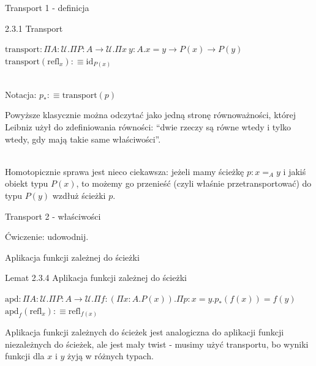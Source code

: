 \documentclass{beamer}
\newcommand{\defn}{:\equiv}
\newcommand{\U}{\mathcal{U}}
\newcommand{\refl}[1]{\text{refl}_{#1}}
\newcommand{\apd}[2]{\text{apd}_{#1}(#2)}
\begin{document}
\begin{frame}{Transport 1 - definicja}

\begin{block}{2.3.1 Transport}

$\text{transport} : \Pi A : \U. \Pi P : A \to \U. \Pi x\ y : A. x = y \to P(x) \to P(y)$ \\
$\text{transport}(\refl{x}) \defn \text{id}_{P(x)}$ \\~\

Notacja: $p_* \defn \text{transport}(p)$

\end{block}

Powyższe klasycznie można odczytać jako jedną stronę równoważności, której Leibniz użył do zdefiniowania równości: ``dwie rzeczy są równe wtedy i tylko wtedy, gdy mają takie same właściwości''.\\~\

Homotopicznie sprawa jest nieco ciekawsza: jeżeli mamy ścieżkę $p : x =_A y$ i jakiś obiekt typu $P(x)$, to możemy go przenieść (czyli właśnie przetransportować) do typu $P(y)$ wzdłuż ścieżki $p$.

\end{frame}

\begin{frame}{Transport 2 - właściwości}


Ćwiczenie: udowodnij.

\end{frame}

\begin{frame}{Aplikacja funkcji zależnej do ścieżki}

\begin{block}{Lemat 2.3.4 Aplikacja funkcji zależnej do ścieżki}

$\text{apd} : \Pi A : \U. \Pi P : A \to \U. \Pi f : (\Pi x : A. P(x)). \Pi p : x = y. p_*(f(x)) = f(y)$ \\
$\apd{f}{\refl{x}} \defn \refl{f(x)}$

\end{block}

Aplikacja funkcji zależnych do ścieżek jest analogiczna do aplikacji funkcji niezależnych do ścieżek, ale jest mały twist - musimy użyć transportu, bo wyniki funkcji dla $x$ i $y$ żyją w różnych typach.

\end{frame}
\end{document}
